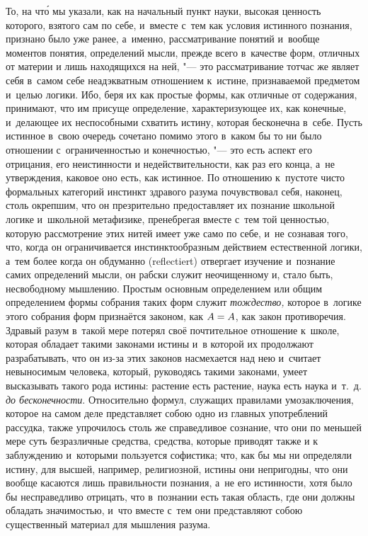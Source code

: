 То, на чт\'{о} мы указали, как на начальный пункт науки, высокая ценность
которого, взятого сам по себе, и~вместе с~тем как условия истинного познания,
признано было уже ранее, а~именно, рассматривание понятий и~вообще моментов
понятия, определений мысли, прежде всего в~качестве форм, отличных от материи и
лишь находящихся на ней, "--- это рассматривание тотчас же являет себя в~самом
себе неадэкватным отношением к~истине, признаваемой предметом и~целью логики.
Ибо, беря их как простые формы, как отличные от содержания, принимают, что им
присуще определение, характеризующее их, как конечные, и~делающее их
неспособными схватить истину, которая бесконечна в~себе. Пусть истинное в~свою
очередь сочетано помимо этого в~каком бы то ни было отношении с~ограниченностью
и конечностью, "--- это есть аспект его отрицания, его неистинности и
недействительности, как раз его конца, а~не утверждения, каковое оно есть, как
истинное. По отношению к~пустоте чисто формальных категорий инстинкт здравого
разума почувствовал себя, наконец, столь окрепшим, что он презрительно
предоставляет их познание школьной логике и~школьной метафизике, пренебрегая
вместе с~тем той ценностью, которую рассмотрение этих нитей имеет уже само по
себе, и~не сознавая того, что, когда он ограничивается инстинктообразным
действием естественной логики, а~тем более когда он обдуманно (reflectiert)
отвергает изучение и~познание самих определений мысли, он рабски служит
неочищенному и, стало быть, несвободному мышлению. Простым основным
определением или общим определением формы собрания таких форм служит
{\em тождество,} которое в~логике этого собрания форм признаётся законом, как
$A\hm=A$, как закон противоречия. Здравый разум в~такой мере потерял своё
почтительное отношение к~школе, которая обладает такими законами истины и~в
которой их продолжают разрабатывать, что он из-за этих законов насмехается над
нею и~считает невыносимым человека, который, руководясь такими законами, умеет
высказывать такого рода истины: растение есть растение, наука есть наука
и~т.~д. {\em до бесконечности}. Относительно формул, служащих правилами
умозаключения, которое на самом деле представляет собою одно из главных
употреблений рассудка, также упрочилось столь же справедливое сознание, что они
по меньшей мере суть безразличные средства, средства, которые приводят также и
к заблуждению и~которыми пользуется софистика; что, как бы мы ни определяли
истину, для высшей, например, религиозной, истины они непригодны, что они
вообще касаются лишь правильности познания, а~не его истинности, хотя было бы
несправедливо отрицать, что в~познании есть такая область, где они должны
обладать значимостью, и~что вместе с~тем они представляют собою существенный
материал для мышления разума.

